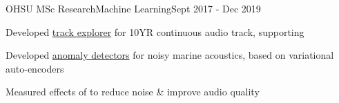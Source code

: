 \documentclass{article}
\newenvironment{**mylist}[4][]%
{%
\subsubsection*{%
    \censor{#2}\tabb #3%
    \if\relax\detokenize{#1}\relax
    \else
      {\;\;(#1)}%
    \fi
    \hfill #4%
}%

\small
  \begin{itemize}%
    \setlength{\topsep}{.2pt}%
    \setlength{\partopsep}{0pt}
    \setlength{\itemsep}{.6pt}%
    \setlength{\parskip}{0pt}%
    \setlength{\parsep}{0pt}%
}%
{%
  \end{itemize}%
}
\newcommand{\LU}[1]{\hspace{-1em}{\bf Technologies : #1}}
\begin{document}
\begin{**mylist}{OHSU MSc Research}{Machine Learning}{Sept 2017 - Dec 2019}
\item Developed \href{https://github.com/probinso/ACOio}{track explorer} for 10YR continuous audio track, supporting  %
\item Developed \href{https://github.com/probinso/gumiho-network}{anomaly detectors} for noisy marine acoustics, based on variational auto-encoders
\item Measured effects of  to reduce noise \& improve audio quality
\end{**mylist}
\end{document}

